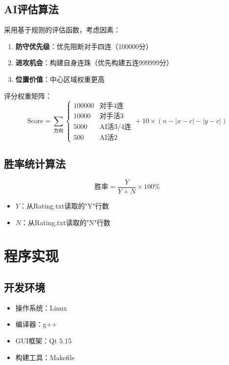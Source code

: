 \documentclass[UTF8]{ctexart}
\begin{document}
\subsection{AI评估算法}
采用基于规则的评估函数，考虑因素：
\begin{enumerate}
    \item \textbf{防守优先级}：优先阻断对手四连（100000分）
    \item \textbf{进攻机会}：构建自身连珠（优先构建五连999999分）
    \item \textbf{位置价值}：中心区域权重更高
\end{enumerate}

评分权重矩阵：
\[
\text{Score} = \sum_{\text{方向}} \begin{cases} 
100000 & \text{对手4连} \\
10000 & \text{对手活3} \\
5000 & \text{AI活3/4连} \\
500 & \text{AI活2}
\end{cases} + 10 \times (n - |x - c| - |y - c|)
\]

\subsection{胜率统计算法}
\[
\text{胜率} = \frac{Y}{Y + N} \times 100\%
\]
\begin{itemize}
    \item $Y$：从Rating.txt读取的"Y"行数
    \item $N$：从Rating.txt读取的"N"行数
\end{itemize}

\section{程序实现}
\subsection{开发环境}
\begin{itemize}
    \item 操作系统：Linux
    \item 编译器：g++
    \item GUI框架：Qt 5.15
    \item 构建工具：Makefile
\end{itemize}
\end{document}
